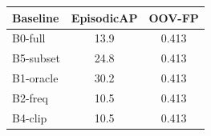 \begin{tabular}{lcc}
\toprule
Baseline & EpisodicAP & OOV-FP \\
\midrule
B0-full & 13.9 & 0.413 \\
B5-subset & 24.8 & 0.413 \\
B1-oracle & 30.2 & 0.413 \\
B2-freq & 10.5 & 0.413 \\
B4-clip & 10.5 & 0.413 \\
\bottomrule
\end{tabular}
